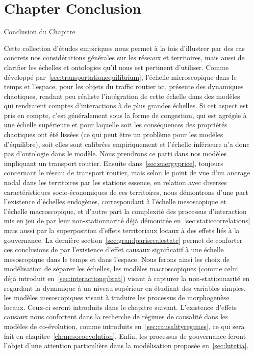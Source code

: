 



\newpage


\section*{Chapter Conclusion}{Conclusion du Chapitre}





Cette collection d'études empiriques nous permet à la fois d'illustrer par des cas concrets nos considérations générales sur les réseaux et territoires, mais aussi de clarifier les échelles et ontologies qu'il nous est pertinent d'utiliser. Comme développé par~\ref{sec:transportationequilibrium}, l'échelle microscopique dans le temps et l'espace, pour les objets du traffic routier ici, présente des dynamiques chaotiques, rendant peu réaliste l'intégration de cette échelle dans des modèles qui rendraient comptes d'interactions à de plus grandes échelles. Si cet aspect est pris en compte, c'est généralement sous la forme de congestion, qui est agrégée à une échelle supérieure et pour laquelle soit les conséquences des propriétés chaotiques ont été lissées (ce qui peut être un problème pour les modèles d'équilibre), soit elles sont calibrées empiriquement et l'échelle inférieure n'a donc pas d'ontologie dans le modèle. Nous prendrons ce parti dans nos modèles impliquant un transport routier. Ensuite dans~\ref{sec:energyprice}, toujours concernant le réseau de transport routier, mais selon le point de vue d'un ancrage nodal dans les territoires par les stations essence, en relation avec diverses caractéristiques socio-économiques de ces territoires, nous démontrons d'une part l'existence d'échelles endogènes, correspondant à l'échelle mesoscopique et l'échelle macroscopique, et d'autre part la complexité des processus d'interaction mis en jeu de par leur non-stationnarité déjà démontrée en~\ref{sec:staticcorrelations} mais aussi par la superposition d'effets territoriaux locaux à des effets liés à la gouvernance. La dernière section~\ref{sec:grandparisrealestate} permet de conforter ces conclusions de par l'existence d'effet causaux significatif à une échelle mesoscopique dans le temps et dans l'espace. Nous ferons ainsi les choix de modélisation de séparer les échelles, les modèles macroscopiques (comme celui déjà introduit en~\ref{sec:interactiongibrat}) visant à capturer la non-stationnarité en regardant la dynamique à un niveau supérieur en étudiant des variables simples, les modèles mesoscopiques visant à traduire les processus de morphogenèse locaux. Ceux-ci seront introduits dans le chapitre suivant. L'existence d'effets causaux nous confortent dans la recherche de régimes de causalité dans les modèles de co-évolution, comme introduits en~\ref{sec:causalityregimes}, ce qui sera fait en chapitre~\ref{ch:mesocoevolution}. Enfin, les processus de gouvernance feront l'objet d'une attention particulière dans la modélisation proposée en~\ref{sec:lutetia}.









\stars

